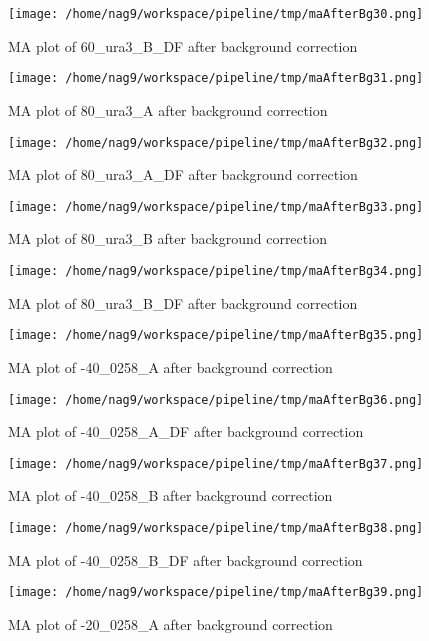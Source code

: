 \documentclass[titlepage]{article}
\begin{document}
\begin{figure}[htb!]
\centering
\texttt{[image: /home/nag9/workspace/pipeline/tmp/maAfterBg30.png]}
\caption{MA plot of 60\_ura3\_B\_DF after background correction}
\end{figure}\pagebreak
\begin{figure}[htb!]
\centering
\texttt{[image: /home/nag9/workspace/pipeline/tmp/maAfterBg31.png]}
\caption{MA plot of 80\_ura3\_A after background correction}
\end{figure}\pagebreak
\begin{figure}[htb!]
\centering
\texttt{[image: /home/nag9/workspace/pipeline/tmp/maAfterBg32.png]}
\caption{MA plot of 80\_ura3\_A\_DF after background correction}
\end{figure}\pagebreak
\begin{figure}[htb!]
\centering
\texttt{[image: /home/nag9/workspace/pipeline/tmp/maAfterBg33.png]}
\caption{MA plot of 80\_ura3\_B after background correction}
\end{figure}\pagebreak
\begin{figure}[htb!]
\centering
\texttt{[image: /home/nag9/workspace/pipeline/tmp/maAfterBg34.png]}
\caption{MA plot of 80\_ura3\_B\_DF after background correction}
\end{figure}\pagebreak
\begin{figure}[htb!]
\centering
\texttt{[image: /home/nag9/workspace/pipeline/tmp/maAfterBg35.png]}
\caption{MA plot of -40\_0258\_A after background correction}
\end{figure}\pagebreak
\begin{figure}[htb!]
\centering
\texttt{[image: /home/nag9/workspace/pipeline/tmp/maAfterBg36.png]}
\caption{MA plot of -40\_0258\_A\_DF after background correction}
\end{figure}\pagebreak
\begin{figure}[htb!]
\centering
\texttt{[image: /home/nag9/workspace/pipeline/tmp/maAfterBg37.png]}
\caption{MA plot of -40\_0258\_B after background correction}
\end{figure}\pagebreak
\begin{figure}[htb!]
\centering
\texttt{[image: /home/nag9/workspace/pipeline/tmp/maAfterBg38.png]}
\caption{MA plot of -40\_0258\_B\_DF after background correction}
\end{figure}\pagebreak
\begin{figure}[htb!]
\centering
\texttt{[image: /home/nag9/workspace/pipeline/tmp/maAfterBg39.png]}
\caption{MA plot of -20\_0258\_A after background correction}
\end{figure}\pagebreak
\end{document}
